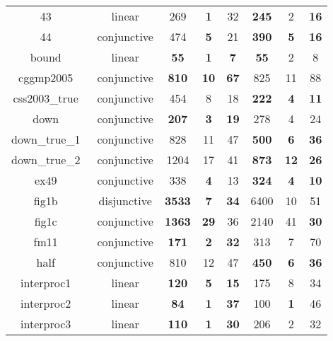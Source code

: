 \begin{table}[t]
\begin{tabular}{l c | c c c | c c c |}
\multicolumn{1}{|c|}{43~\cite{isil2013inductive}}				&linear			&269	&\textbf{1}	&32					       &\textbf{245}	&2	&\textbf{16}		\\
\multicolumn{1}{|c|}{44~\cite{isil2013inductive}}				&conjunctive	&474	&\textbf{5}	&21	&\textbf{390}	&\textbf{5}	&\textbf{16}\\
\multicolumn{1}{|c|}{bound~\cite{gupta2009invgen}}				&linear 		&\textbf{55}	&\textbf{1}	&\textbf{7}	&\textbf{55}	&2	&8\\
\multicolumn{1}{|c|}{cggmp2005~\cite{Dirk:SVCOMP:2016}}			&conjunctive	&\textbf{810}	&\textbf{10}	&\textbf{67}	&825	&11	&88\\
\multicolumn{1}{|c|}{css2003\_true~\cite{Dirk:SVCOMP:2016}}		&conjunctive	&454	&8	&18	&\textbf{222}	&\textbf{4}	&\textbf{11}\\
\multicolumn{1}{|c|}{down~\cite{gupta2009invgen}}				&conjunctive	&\textbf{207}	&\textbf{3}	&\textbf{19}       &278	&4	&24								\\
\multicolumn{1}{|c|}{down\_true\_1~\cite{Dirk:SVCOMP:2016}}		&conjunctive 	&828	&11	&47	&\textbf{500}	&\textbf{6}	&\textbf{36}\\
\multicolumn{1}{|c|}{down\_true\_2~\cite{Dirk:SVCOMP:2016}}		&conjunctive 	&1204	&17	&41	&\textbf{873}	&\textbf{12}	&\textbf{26}\\
\multicolumn{1}{|c|}{ex49~\cite{necla:benchmark}}				&conjunctive	&338	&\textbf{4}	&13	&\textbf{324}	&\textbf{4}	&\textbf{10}\\
\multicolumn{1}{|c|}{fig1b~\cite{zilu:repo}}					&disjunctive	&\textbf{3533} 	& \textbf{7} &\textbf{34} 	   & 6400 & 10 		& 51 					\\
\multicolumn{1}{|c|}{fig1c~\cite{zilu:repo}}					&conjunctive	&\textbf{1363}	&\textbf{29}	&36	&2140	&41	&\textbf{30}\\
\multicolumn{1}{|c|}{fm11~\cite{schwartznon}}					&conjunctive	&\textbf{171}	&\textbf{2}	&\textbf{32}       &313	&7	&70								\\
\multicolumn{1}{|c|}{half~\cite{gupta2009invgen}}				&conjunctive	&810	&12	&47 &\textbf{450}	&\textbf{6}	&\textbf{36}\\
\multicolumn{1}{|c|}{interproc1~\cite{jeannet2010interproc}}	&linear			&\textbf{120}	&\textbf{5}	&\textbf{15}   &175	&8	&34									\\
\multicolumn{1}{|c|}{interproc2~\cite{jeannet2010interproc}}	&linear 		&\textbf{84}	&\textbf{1}	&\textbf{37}	&100	&\textbf{1}	&46\\
\multicolumn{1}{|c|}{interproc3~\cite{jeannet2010interproc}}	&linear			&\textbf{110}	&\textbf{1}	&\textbf{30}   &206	&2	&32									\\

\end{tabular}
\end{table}
